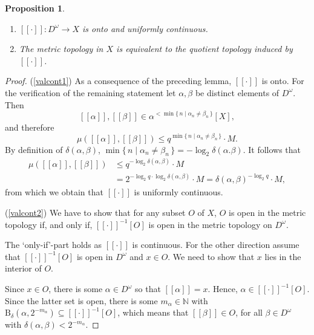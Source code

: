 \documentclass[microtype]{jloganal}
\theoremstyle{plain}
\newtheorem{proposition}[theorem]{Proposition}
\theoremstyle{definition}
\newcommand{\NN}{\mathbb{N}}
\newcommand{\ball}[3]{\mathrm{B}_{#1}(#2,#3)}
\newcommand{\val}[1]{[\![#1]\!]}
\newcommand{\set}[2]{\mbox{$\{\,#1 \mid #2 \,\}$}}
\newcommand{\fun}[3]{\mbox{$#1 \colon #2 \rightarrow #3$}}
\begin{document}
\begin{proposition}\label{prop-valcont}
\begin{enumerate}
\item \label{valcont1} $\fun{\val{\cdot}}{D^\omega}{X}$ is onto and uniformly continuous.  
\item \label{valcont2} The metric topology in $X$ is equivalent to the quotient topology induced by $\val{\cdot}$.
\end{enumerate}
\end{proposition}
\begin{proof}
(\ref{valcont1}) As a consequence of the preceding lemma, $\val{\cdot}$ is onto. For the verification of the remaining statement let $\alpha, \beta$ be distinct elements of $D^\omega$. Then $$\val{\alpha}, \val{\beta} \in \alpha^{< \min \set{n}{\alpha_n \neq \beta_n}}[X],$$ and therefore 
\begin{equation}\label{eq-mudelta}
\mu(\val{\alpha}, \val{\beta}) \le q^{\min \set{n}{\alpha_n \neq \beta_n}} \cdot M.
\end{equation}
By definition of $\delta(\alpha, \beta)$, $\min\set{n}{\alpha_n \neq \beta_n} = - \log_2 \delta(\alpha. \beta)$. It follows that
\begin{equation}\label{eq-unicont}
\begin{split}
\mu(\val{\alpha}, \val{\beta}) &\le q^{- \log_2 \delta(\alpha, \beta)} \cdot M \\
&= 2^{- \log_2 q \cdot \log_2 \delta(\alpha, \beta)} \cdot M = \delta(\alpha, \beta)^{- \log_2 q} \cdot M,
\end{split}
\end{equation}
from which we obtain that $\val{\cdot}$ is uniformly continuous.

(\ref{valcont2}) We have to show that for any subset $O$ of $X$, $O$ is open in the metric topology if, and only if, $\val{\cdot}^{-1}[O]$ is open in the metric topology on $D^\omega$. 

The `only-if'-part holds as $\val{\cdot}$ is continuous. For the other direction assume that $\val{\cdot}^{-1}[O]$ is open in $D^\omega$ and $x \in O$. We need to show that $x$ lies in the interior of $O$.

Since $x \in O$, there is some $\alpha \in D^\omega$ so that $\val{\alpha} = x$. Hence, $\alpha \in \val{\cdot}^{-1}[O]$. Since the latter set is open, there is some $m_\alpha \in \NN$ with $\ball{\delta}{\alpha}{2^{-m_\alpha}} \subseteq \val{\cdot}^{-1}[O]$, which means that $\val{\beta} \in O$, for all $\beta \in D^\omega$ with $\delta(\alpha, \beta) < 2^{-m_\alpha}$.


\end{proof}
\end{document}
